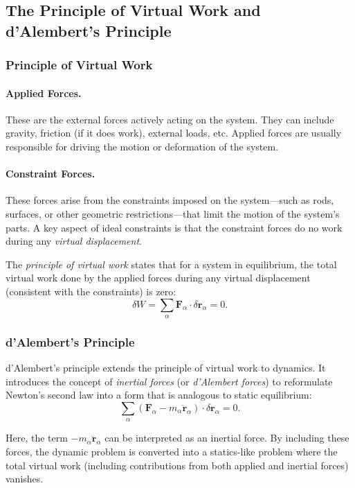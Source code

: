 \subsection{The Principle of Virtual Work and d'Alembert's Principle}

\subsubsection*{Principle of Virtual Work}

\paragraph{Applied Forces.}  These are the external forces actively acting on the system. They can include gravity, friction (if it does work), external loads, etc. Applied forces are usually responsible for driving the motion or deformation of the system.

\paragraph{Constraint Forces.}  These forces arise from the constraints imposed on the system—such as rods, surfaces, or other geometric restrictions—that limit the motion of the system's parts. A key aspect of ideal constraints is that the constraint forces do no work during any \emph{virtual displacement}.

The \emph{principle of virtual work} states that for a system in equilibrium, the total virtual work done by the applied forces during any virtual displacement (consistent with the constraints) is zero:
\begin{equation}
    \delta W = \sum_\alpha \mathbf{F}_\alpha \cdot \delta \mathbf{r}_\alpha = 0.
\end{equation}

\subsubsection*{d'Alembert's Principle}

d'Alembert's principle extends the principle of virtual work to dynamics. It introduces the concept of \emph{inertial forces} (or \emph{d'Alembert forces}) to reformulate Newton's second law into a form that is analogous to static equilibrium:
\begin{equation}
    \sum_\alpha \left( \mathbf{F}_\alpha - m_\alpha \ddot{\mathbf{r}}_\alpha \right) \cdot \delta \mathbf{r}_\alpha = 0.
\end{equation}

Here, the term \( -m_\alpha \ddot{\mathbf{r}}_\alpha \) can be interpreted as an inertial force. By including these forces, the dynamic problem is converted into a statics-like problem where the total virtual work (including contributions from both applied and inertial forces) vanishes.

